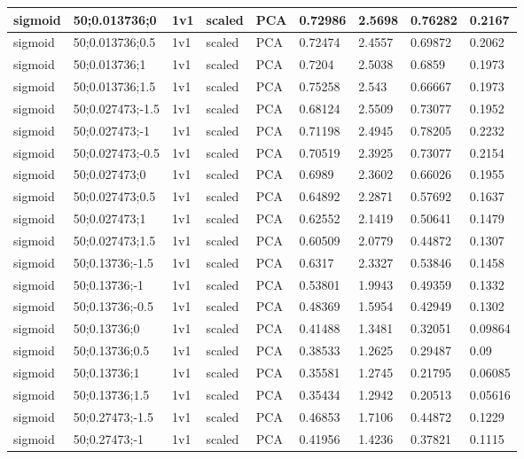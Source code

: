 \begin{longtable}{lllllllll}
sigmoid & 50;0.013736;0 & 1v1 & scaled & PCA & 0.72986 & 2.5698 & 0.76282 & 0.2167\\ \hline
sigmoid & 50;0.013736;0.5 & 1v1 & scaled & PCA & 0.72474 & 2.4557 & 0.69872 & 0.2062\\ \hline
sigmoid & 50;0.013736;1 & 1v1 & scaled & PCA & 0.7204 & 2.5038 & 0.6859 & 0.1973\\ \hline
sigmoid & 50;0.013736;1.5 & 1v1 & scaled & PCA & 0.75258 & 2.543 & 0.66667 & 0.1973\\ \hline
sigmoid & 50;0.027473;-1.5 & 1v1 & scaled & PCA & 0.68124 & 2.5509 & 0.73077 & 0.1952\\ \hline
sigmoid & 50;0.027473;-1 & 1v1 & scaled & PCA & 0.71198 & 2.4945 & 0.78205 & 0.2232\\ \hline
sigmoid & 50;0.027473;-0.5 & 1v1 & scaled & PCA & 0.70519 & 2.3925 & 0.73077 & 0.2154\\ \hline
sigmoid & 50;0.027473;0 & 1v1 & scaled & PCA & 0.6989 & 2.3602 & 0.66026 & 0.1955\\ \hline
sigmoid & 50;0.027473;0.5 & 1v1 & scaled & PCA & 0.64892 & 2.2871 & 0.57692 & 0.1637\\ \hline
sigmoid & 50;0.027473;1 & 1v1 & scaled & PCA & 0.62552 & 2.1419 & 0.50641 & 0.1479\\ \hline
sigmoid & 50;0.027473;1.5 & 1v1 & scaled & PCA & 0.60509 & 2.0779 & 0.44872 & 0.1307\\ \hline
sigmoid & 50;0.13736;-1.5 & 1v1 & scaled & PCA & 0.6317 & 2.3327 & 0.53846 & 0.1458\\ \hline
sigmoid & 50;0.13736;-1 & 1v1 & scaled & PCA & 0.53801 & 1.9943 & 0.49359 & 0.1332\\ \hline
sigmoid & 50;0.13736;-0.5 & 1v1 & scaled & PCA & 0.48369 & 1.5954 & 0.42949 & 0.1302\\ \hline
sigmoid & 50;0.13736;0 & 1v1 & scaled & PCA & 0.41488 & 1.3481 & 0.32051 & 0.09864\\ \hline
sigmoid & 50;0.13736;0.5 & 1v1 & scaled & PCA & 0.38533 & 1.2625 & 0.29487 & 0.09\\ \hline
sigmoid & 50;0.13736;1 & 1v1 & scaled & PCA & 0.35581 & 1.2745 & 0.21795 & 0.06085\\ \hline
sigmoid & 50;0.13736;1.5 & 1v1 & scaled & PCA & 0.35434 & 1.2942 & 0.20513 & 0.05616\\ \hline
sigmoid & 50;0.27473;-1.5 & 1v1 & scaled & PCA & 0.46853 & 1.7106 & 0.44872 & 0.1229\\ \hline
sigmoid & 50;0.27473;-1 & 1v1 & scaled & PCA & 0.41956 & 1.4236 & 0.37821 & 0.1115\\ \hline

\end{longtable}
